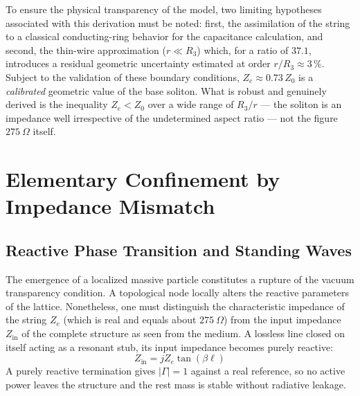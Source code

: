 \documentclass[11pt,a4paper]{article}
\theoremstyle{plain}
\theoremstyle{remark}
\begin{document}
To ensure the physical transparency of the model, two limiting hypotheses associated with this derivation must be noted: first, the assimilation of the string to a classical conducting-ring behavior for the capacitance calculation, and second, the thin-wire approximation ($r \ll R_3$) which, for a ratio of $37.1$, introduces a residual geometric uncertainty estimated at order $r/R_3 \approx 3\,\%$. Subject to the validation of these boundary conditions, $Z_e \approx 0.73\,Z_0$ is a \emph{calibrated} geometric value of the base soliton. What is robust and genuinely derived is the inequality $Z_e < Z_0$ over a wide range of $R_3/r$ --- the soliton is an impedance well irrespective of the undetermined aspect ratio --- not the figure $275~\Omega$ itself.

\section{Elementary Confinement by Impedance Mismatch}
\label{sec:impedance_confinement}

\subsection{Reactive Phase Transition and Standing Waves}
The emergence of a localized massive particle constitutes a rupture of the vacuum transparency condition. A topological node locally alters the reactive parameters of the lattice. Nonetheless, one must distinguish the characteristic impedance of the string $Z_e$ (which is real and equals about $275~\Omega$) from the input impedance $Z_{\text{in}}$ of the complete structure as seen from the medium. A lossless line closed on itself acting as a resonant stub, its input impedance becomes purely reactive:
\begin{equation}\label{eq:Zin_stub}
Z_{\text{in}} = j Z_e \tan(\beta \ell)
\end{equation}
A purely reactive termination gives $|\Gamma| = 1$ against a real reference, so no active power leaves the structure and the rest mass is stable without radiative leakage.
\end{document}
